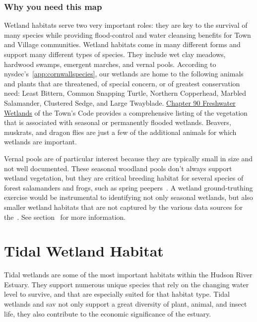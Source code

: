 \subsection*{Why you need this map}
Wetland habitats serve two very important roles: they are key to the survival
of many species while providing flood-control and water cleansing benefits for
Town and Village communities. Wetland habitats come in many different forms and
support many different types of species. They include wet clay meadows,
hardwood swamps, emergent marches, and vernal pools. According to
\gls{nysdec}'s~\ref{app:cornwallspecies}, our wetlands are home to the following
animals and plants that are threatened, of special concern, or of greatest
conservation need: Least Bittern, Common Snapping Turtle, Northern Copperhead,
Marbled Salamander, Clustered Sedge, and Large Twayblade.
\href{https://ecode360.com/10555547?highlight=wetlands#10555547}{Chapter 90
Freshwater Wetlands} of the Town’s Code provides a comprehensive listing of the
vegetation that is associated with seasonal or permanently flooded wetlands.
Beavers, muskrats, and dragon flies are just a few of the additional animals
for which wetlands are important.
\par
Vernal pools are of particular interest because they are typically small in
size and not well documented. These seasonal woodland pools don't always
support wetland vegetation, but they are critical breeding habitat for several
species of forest salamanders and frogs, such as spring
peepers~\citep{haeckel2014}. A wetland ground-truthing exercise would be
instrumental to identifying not only seasonal wetlands, but also smaller
wetland habitats that are not captured by the various data sources for the~.
See section~ for more information.

\label{map:tidalwetlandsandSAV}
\chapter{Tidal Wetland Habitat}\label{subsec:tidalandwetlandhabitat}
Tidal wetlands are some of the most important habitats within the Hudson River
Estuary. They support numerous unique species that rely on the changing water
level to survive, and that are especially suited for that habitat type. Tidal
wetlands and \gls{sav} not only support a great diversity of plant, animal, and
insect life, they also contribute to the economic significance of the estuary.

